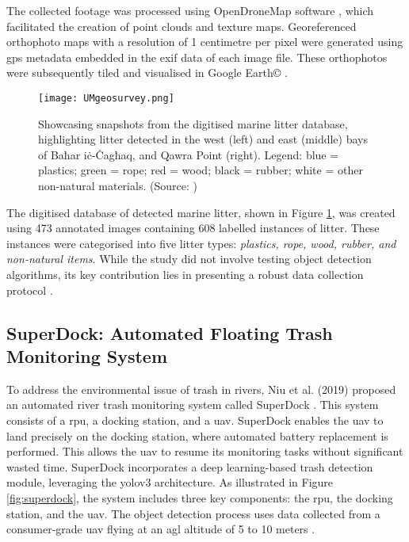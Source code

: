 The collected footage was processed using OpenDroneMap software \cite{OpenDroneMap}, which facilitated the creation of point clouds and texture maps. Georeferenced orthophoto maps with a resolution of 1 centimetre per pixel were generated using \gls{gps} metadata embedded in the \gls{exif} data of each image file. These orthophotos were subsequently tiled and visualised in Google Earth© \cite{umgeosurvey}.

\begin{figure}[!htbp]
    \centering
    \texttt{[image: UMgeosurvey.png]}
    \caption{Showcasing snapshots from the digitised marine litter database, highlighting litter detected in the west (left) and east (middle) bays of Baħar iċ-Ċagħaq, and Qawra Point (right). Legend: blue = plastics; green = rope; red = wood; black = rubber; white = other non-natural materials. (Source: \cite{umgeosurvey})}
    \label{fig:geosurvey}
\end{figure}

The digitised database of detected marine litter, shown in Figure \ref{fig:geosurvey}, was created using 473 annotated images containing 608 labelled instances of litter. These instances were categorised into five litter types: \textit{plastics, rope, wood, rubber, and non-natural items}. While the study did not involve testing object detection algorithms, its key contribution lies in presenting a robust data collection protocol \cite{umgeosurvey}.

\subsection{SuperDock: Automated Floating Trash Monitoring System}
\label{subsec:3_superdock}

To address the environmental issue of trash in rivers, Niu et al. (2019) proposed an automated river trash monitoring system called SuperDock \cite{superdock}. This system consists of a \gls{rpu}, a docking station, and a \gls{uav}. SuperDock enables the \gls{uav} to land precisely on the docking station, where automated battery replacement is performed. This allows the \gls{uav} to resume its monitoring tasks without significant wasted time. SuperDock incorporates a deep learning-based trash detection module, leveraging the \gls{yolo}v3 architecture. As illustrated in Figure \ref{fig:superdock}, the system includes three key components: the \gls{rpu}, the docking station, and the \gls{uav}. The object detection process uses data collected from a consumer-grade \gls{uav} flying at an \gls{agl} altitude of 5 to 10 meters \cite{superdock}.

